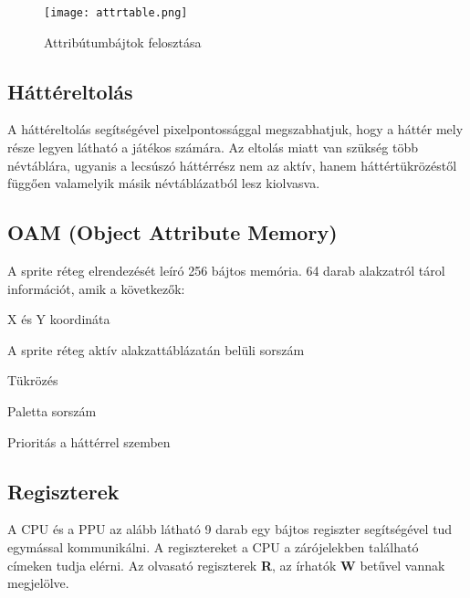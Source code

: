 \begin{figure}[H]
	\centering
	\texttt{[image: attrtable.png]}
	\caption{Attribútumbájtok felosztása}
	\label{fig:attr}
\end{figure}

\subsection{Háttéreltolás}

A háttéreltolás segítségével pixelpontossággal megszabhatjuk, hogy a háttér mely része legyen látható a játékos számára.
Az eltolás miatt van szükség több névtáblára, ugyanis a lecsúszó háttérrész nem az aktív, hanem háttértükrözéstől függően valamelyik másik névtáblázatból lesz kiolvasva. \cite{memmirror} \cite{scroll}

\subsection{OAM (Object Attribute Memory) \cite{ppuref}}

A sprite réteg elrendezését leíró 256 bájtos memória. 64 darab alakzatról tárol információt, amik a következők:

\begin{compactitem}
	\item X és Y koordináta
	\item A sprite réteg aktív alakzattáblázatán belüli sorszám
	\item Tükrözés
	\item Paletta sorszám
	\item Prioritás a háttérrel szemben
\end{compactitem}

\subsection{Regiszterek \cite{ppuref}}

A CPU és a PPU az alább látható 9 darab egy bájtos regiszter segítségével tud egymással kommunikálni. A regisztereket a CPU a zárójelekben található címeken tudja elérni.
Az olvasató regiszterek \textbf{R}, az írhatók \textbf{W} betűvel vannak megjelölve.

\vspace{0.25cm}

